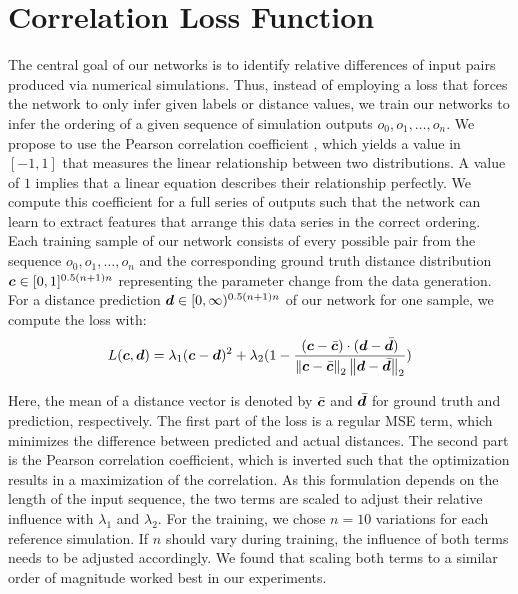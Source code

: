 \documentclass{article}
\begin{document}

\section{Correlation Loss Function}\label{sec: loss}

The central goal of our networks is to identify relative differences of input pairs produced via numerical simulations.
Thus, instead of employing a loss that forces the network to only infer given labels or distance values,
we train our networks to infer the ordering of a given sequence of simulation outputs $o_0, o_1, \dotsc, o_n$. 
We propose to use the Pearson correlation coefficient \citep[see][]{pearson1920}, which yields a value in $[-1,1]$ that measures the linear relationship between two distributions. A value of $1$ implies that a linear equation describes their relationship perfectly. We compute this coefficient for a full series of outputs such that the network can learn to extract features that arrange this data series in the correct ordering.
Each training sample of our network consists of every possible pair from the sequence $o_0, o_1, \dotsc, o_n$ and the corresponding ground truth distance distribution ${\bm{c}} \in [0,1]^{0.5 (n+1) n}$ representing the parameter change from the data generation. For a distance prediction ${\bm{d}} \in [0,\infty)^{0.5 (n+1) n}$ of our network for one sample, we compute the loss with:
\begin{equation}
    L({\bm{c}}, {\bm{d}}) = \lambda_1 ({\bm{c}} - {\bm{d}})^2 + \lambda_2 (1 - \frac{({\bm{c}} - \bar{{\bm{c}}}) \cdot ({\bm{d}} - \bar{{\bm{d}}})}{\left\|{\bm{c}} - \bar{{\bm{c}}}\right\|_2 \left\|{\bm{d}} - \bar{{\bm{d}}}\right\|_2} )
    \label{eq: training loss}
\end{equation}

Here, the mean of a distance vector is denoted by $\bar{{\bm{c}}}$ and $\bar{{\bm{d}}}$ for ground truth and prediction, respectively. The first part of the loss is a regular MSE term, which minimizes the difference between predicted and actual distances. The second part is the Pearson correlation coefficient, which is inverted such that the optimization results in a maximization of the correlation.
As this formulation depends on the length of the input sequence, the two terms are scaled to adjust their relative influence with $\lambda_1$ and $\lambda_2$. For the training, we chose $n=10$ variations for each reference simulation. If $n$ should vary during training, the influence of both terms needs to be adjusted accordingly. We found that scaling both terms to a similar order of magnitude worked best in our experiments.
\end{document}
